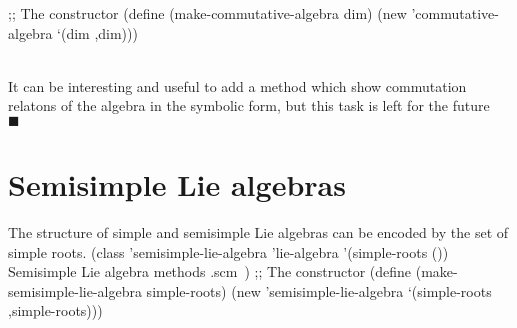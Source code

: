 \documentclass[a4paper,10pt]{article}%
\theoremstyle{definition} \newtheorem{Def}{Definition}
\newenvironment{comment}
{\par\noindent{\bf TODO}\\}
{\\\hfill$\scriptstyle\blacksquare$\par}
\begin{document}
;; The constructor
(define (make-commutative-algebra dim)
  (new 'commutative-algebra `(dim ,dim)))
\nwendcode{}\nwdocspar
\begin{comment}
It can be interesting and useful to add a method which show commutation relatons of the algebra in the symbolic form, but this task is left for the future  
\end{comment}
\nwenddocs{}\nwdocspar

\section{Semisimple Lie algebras}
\label{sec:semis-lie-algebra}
The structure of simple and semisimple Lie algebras can be encoded by the set of simple roots. 
\nwenddocs{}\endmoddef\nwstartdeflinemarkup{}\nwenddeflinemarkup
(class 'semisimple-lie-algebra 'lie-algebra
       '(simple-roots ())
       \LA{}Semisimple Lie algebra methods .scm~{\nwtagstyle{}}\RA{})
;; The constructor
(define (make-semisimple-lie-algebra simple-roots)
  (new 'semisimple-lie-algebra `(simple-roots ,simple-roots)))

\nwendcode{}\nwdocspar
\end{document}
